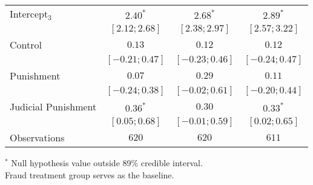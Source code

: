 \begin{table}[h]
\begin{center}
\begin{threeparttable}
\begin{tabular}{l c c c}
Intercept$_3$       & $2.40^{*}$        & $2.68^{*}$        & $2.89^{*}$        \\
                    & $ [ 2.12;  2.68]$ & $ [ 2.38;  2.97]$ & $ [ 2.57;  3.22]$ \\
Control             & $0.13$            & $0.12$            & $0.12$            \\
                    & $ [-0.21;  0.47]$ & $ [-0.23;  0.46]$ & $ [-0.24;  0.47]$ \\
Punishment          & $0.07$            & $0.29$            & $0.11$            \\
                    & $ [-0.24;  0.38]$ & $ [-0.02;  0.61]$ & $ [-0.20;  0.44]$ \\
Judicial Punishment & $0.36^{*}$        & $0.30$            & $0.33^{*}$        \\
                    & $ [ 0.05;  0.68]$ & $ [-0.01;  0.59]$ & $ [ 0.02;  0.65]$ \\
\hline
Observations        & $620$             & $620$             & $611$             \\
\hline
\end{tabular}
\begin{tablenotes}[flushleft]
\scriptsize{$^*$ Null hypothesis value outside 89\% credible interval.  \\
Fraud treatment group serves as the baseline.}
\end{tablenotes}
\end{threeparttable}
\label{table:coefficients}
\end{center}
\end{table}
